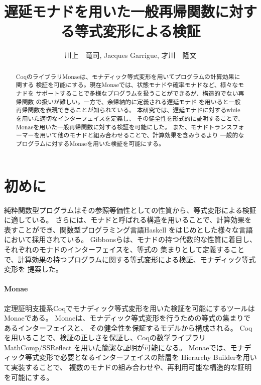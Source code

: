 \documentclass[japanese]{jssst_ppl}
\title{遅延モナドを用いた一般再帰関数に対する等式変形による検証}
\author{川上　竜司, Jacques Garrigue, 才川　隆文}
\theoremstyle{definition}
\begin{document}
\maketitle
\begin{abstract}
  CoqのライブラリMonaeは、モナディック等式変形を用いてプログラムの計算効果に関する
  検証を可能にする。現在Monaeでは、状態モナドや確率モナドなど、様々なモナドを
  サポートすることで多様なプログラムを扱うことができるが、構造的でない再帰関数
  の扱いが難しい。一方で、余帰納的に定義される遅延モナド
  を用いると一般再帰関数を表現できることが知られている。
  本研究では、遅延モナドに対するwhileを用いた適切なインターフェイスを定義し、
  その健全性を形式的に証明することで、Monaeを用いた一般再帰関数に対する検証を可能にした。
  また、モナドトランスフォーマーを用いて他のモナドと組み合わせることで、計算効果を含みうるより
  一般的なプログラムに対するMonaeを用いた検証を可能にする。
\end{abstract}

\section{初めに}
純粋関数型プログラムはその参照等価性としての性質から、等式変形による検証に適している。
さらには、モナドと呼ばれる構造を用いることで、計算効果を表すことができ、関数型プログラミング言語Haskell
をはじめとした様々な言語において採用されている。
Gibbonsらは、モナドの持つ代数的な性質に着目し、それぞれのモナドのインターフェイスを、等式の
集まりとして定義することで、計算効果の持つプログラムに関する等式変形による検証、モナディック等式変形を
提案した\cite{10.1145/2034574.2034777}。


\paragraph{Monae}
定理証明支援系Coq\cite{Coq}でモナディック等式変形を用いた検証を可能にするツールはMonae\cite{monae}である。
Monaeは、モナディック等式変形を行うための等式の集まりであるインターフェイスと、
その健全性を保証するモデルから構成される。
Coqを用いることで、検証の正しさを保証し、Coqの数学ライブラリMathComp/SSReflect\cite{Gonthier_Mahboubi_2010}
を用いた簡潔な証明が可能になる。
Monaeでは、モナディック等式変形で必要となるインターフェイスの階層を
Hierarchy Builder\cite{cohen:hal-02478907}を用いて実装することで、
複数のモナドの組み合わせや、再利用可能な構造的な証明を可能にする。
\end{document}
